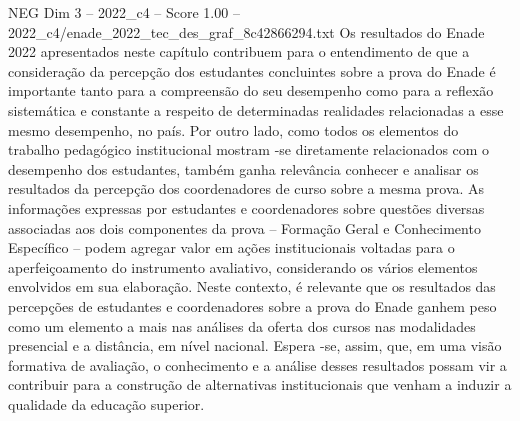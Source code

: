 \begin{textsample}{NEG Dim 3 – 2022\_c4 – Score 1.00 – 2022\_c4/enade\_2022\_tec\_des\_graf\_8c42866294.txt}
Os resultados do Enade 2022 apresentados neste capítulo contribuem para o entendimento de que a consideração da percepção dos estudantes concluintes sobre a prova do Enade é importante tanto para a compreensão do seu desempenho como para a reflexão sistemática e constante a respeito de determinadas realidades relacionadas a esse mesmo desempenho, no país.
Por outro lado, como todos os elementos do trabalho pedagógico institucional mostram -se diretamente relacionados com o desempenho dos estudantes, também ganha relevância conhecer e analisar os resultados da percepção dos coordenadores de curso sobre a mesma prova.
As informações expressas por estudantes e coordenadores sobre questões diversas associadas aos dois componentes da prova – Formação Geral e Conhecimento Específico – podem agregar valor em ações institucionais voltadas para o aperfeiçoamento do instrumento avaliativo, considerando os vários elementos envolvidos em sua elaboração.
Neste contexto, é relevante que os resultados das percepções de estudantes e coordenadores sobre a prova do Enade ganhem peso como um elemento a mais nas análises da oferta dos cursos nas modalidades presencial e a distância, em nível nacional.
Espera -se, assim, que, em uma visão formativa de avaliação, o conhecimento e a análise desses resultados possam vir a contribuir para a construção de alternativas institucionais que venham a induzir a qualidade da educação superior.

\end{textsample}
